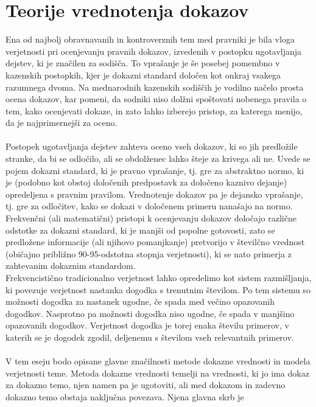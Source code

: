 \documentclass[12pt,a4paper]{amsart}
\theoremstyle{definition} %
\theoremstyle{plain} %
\begin{document}
\section{Teorije vrednotenja dokazov}
Ena od najbolj obravnavanih in kontroverznih tem med pravniki je bila vloga verjetnosti pri ocenjevanju pravnih dokazov, izvedenih v postopku 
ugotavljanja dejstev, ki je značilen za sodišča. To vprašanje je še posebej pomembno v kazenskih postopkih, kjer je dokazni standard določen kot 
onkraj vsakega razumnega dvoma. Na mednarodnih kazenskih sodiščih je vodilno načelo prosta ocena dokazov, kar pomeni, da sodniki niso dolžni 
spoštovati nobenega pravila o tem, kako ocenjevati dokaze, in zato lahko izberejo pristop, za katerega menijo, da je najprimernejši za oceno.\\\\
Postopek ugotavljanja dejstev zahteva oceno vseh dokazov, ki so jih predložile stranke, da bi se odločilo, ali se obdolženec lahko šteje za krivega 
ali ne. Uvede se pojem dokazni standard, ki je pravno vprašanje, tj. gre za abstraktno normo, ki je (podobno kot obstoj določenih predpostavk za 
določeno kaznivo dejanje) opredeljena s pravnim pravilom. Vrednotenje dokazov pa je dejansko vprašanje, tj. gre za odločitev, kako se dokazi v določenem 
primeru nanašajo na normo. \\
Frekvenčni (ali matematični) pristopi k ocenjevanju dokazov določajo različne odstotke za dokazni standard, ki je manjši od popolne gotovosti, zato se 
predložene informacije (ali njihovo pomanjkanje) pretvorijo v številčno vrednost (običajno približno 90-95-odstotna stopnja verjetnosti), ki se nato 
primerja z zahtevanim dokaznim standardom.\\
Frekvencistično tradicionalno verjetnost lahko opredelimo kot sistem razmišljanja, ki povezuje verjetnost nastanka dogodka s trenutnim številom. Po 
tem sistemu so možnosti dogodka za nastanek ugodne, če spada med večino opazovanih dogodkov. Nasprotno pa možnosti dogodka niso ugodne, če spada 
v manjšino opazovanih dogodkov. Verjetnost dogodka je torej enaka številu primerov, v katerih se je dogodek zgodil, deljenemu s številom vseh 
relevantnih primerov.\\\\
V tem eseju bodo opisane glavne značilnosti metode dokazne vrednosti in modela verjetnosti teme. Metoda dokazne vrednosti temelji na vrednosti, ki 
jo ima dokaz za dokazno temo, njen namen pa je ugotoviti, ali med dokazom in zadevno dokazno temo obstaja naključna povezava. Njena glavna skrb je 
\end{document}
